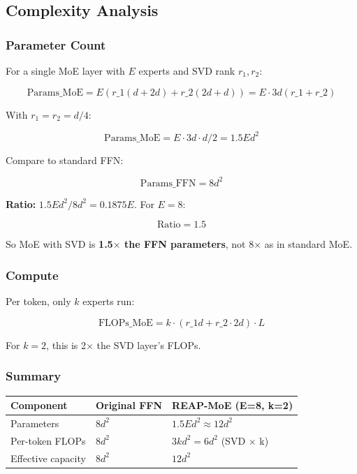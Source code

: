 \subsection{Complexity Analysis}

\subsubsection{Parameter Count}

For a single MoE layer with $E$ experts and SVD rank $r_1, r_2$:

\[
\text{Params}\_\text{MoE} = E \left( r\_1(d + 2d) + r\_2(2d + d) \right) = E \cdot 3d(r\_1 + r\_2)
\tag{4.14}
\]

With $r_1 = r_2 = d/4$:

\[
\text{Params}\_\text{MoE} = E \cdot 3d \cdot d/2 = 1.5 E d^2
\tag{4.15}
\]

Compare to standard FFN:

\[
\text{Params}\_\text{FFN} = 8 d^2
\tag{4.16}
\]

\textbf{Ratio:} $1.5 E d^2 / 8 d^2 = 0.1875 E$. For $E = 8$:

\[
\text{Ratio} = 1.5
\tag{4.17}
\]

So MoE with SVD is \textbf{1.5$\times$ the FFN parameters}, not 8$\times$ as in standard MoE.

\subsubsection{Compute}

Per token, only $k$ experts run:

\[
\text{FLOPs}\_\text{MoE} = k \cdot (r\_1 d + r\_2 \cdot 2d) \cdot L
\tag{4.18}
\]

For $k = 2$, this is 2$\times$ the SVD layer's FLOPs.

\subsubsection{Summary}

\begin{table}[H]
\centering
\small
\begin{tabular}{lll}
\toprule
\textbf{Component} & \textbf{Original FFN} & \textbf{REAP-MoE (E=8, k=2)} \\
\midrule
Parameters & $8d^2$ & $1.5 E d^2 \approx 12d^2$ \\
Per-token FLOPs & $8d^2$ & $3 k d^2 = 6d^2$ (SVD $\times$ k) \\
Effective capacity & $8d^2$ & $12d^2$ \\
\bottomrule
\end{tabular}
\end{table}

